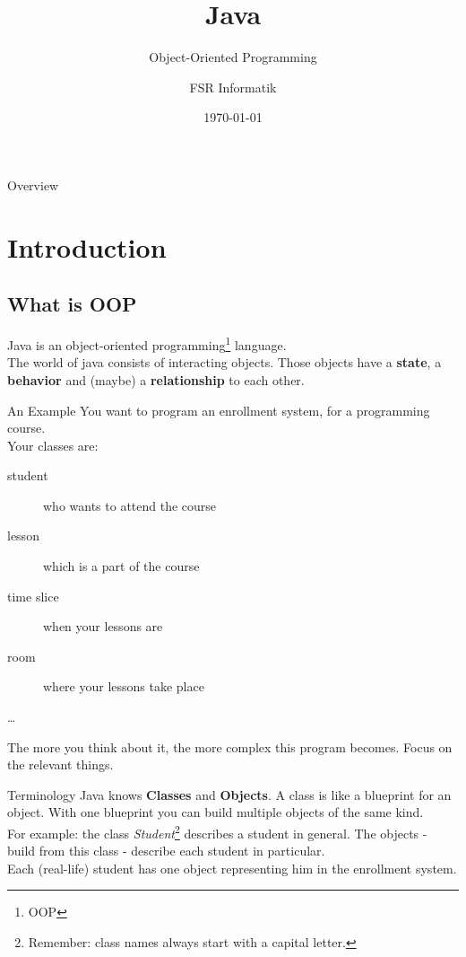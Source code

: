 

\title{Java}
\subtitle{Object-Oriented Programming}
\author{FSR Informatik}
\date{\today}



\begin{frame}
\titlepage
\end{frame}
\begin{frame}{Overview}
\tableofcontents
\end{frame}

\section{Introduction}
\subsection{What is OOP}
\begin{frame}{}
	Java is an object-oriented programming\footnote{OOP} language. \\
	\vspace{1em}
	The world of java consists of interacting objects. Those objects have a \textbf{state}, 
	a \textbf{behavior} and (maybe) a \textbf{relationship} to each other.
\end{frame}

\begin{frame}{An Example}
	You want to program an enrollment system, for a programming course. \\
	\vspace{1em}
	Your classes are:\\
	\begin{description}
		\item[student] who wants to attend the course
		\item[lesson] which is a part of the course
		\item[time slice] when your lessons are
		\item[room] where your lessons take place
		\item[\dots]
	\end{description}
	The more you think about it, the more complex this program becomes.
	Focus on the relevant things.
\end{frame}
	
\begin{frame}{Terminology} %
	Java knows \textbf{Classes} and \textbf{Objects}. A class is like a blueprint for an object. 
	With one blueprint you can build multiple objects of the same kind. \\
	\vspace{1em}
	For example: the class \emph{Student}\footnote{Remember: class names always start with a capital letter.} describes a student in general. 
	The objects - build from this class - describe each student in particular. \\
	Each (real-life) student has one object representing him in the enrollment system.
\end{frame}


